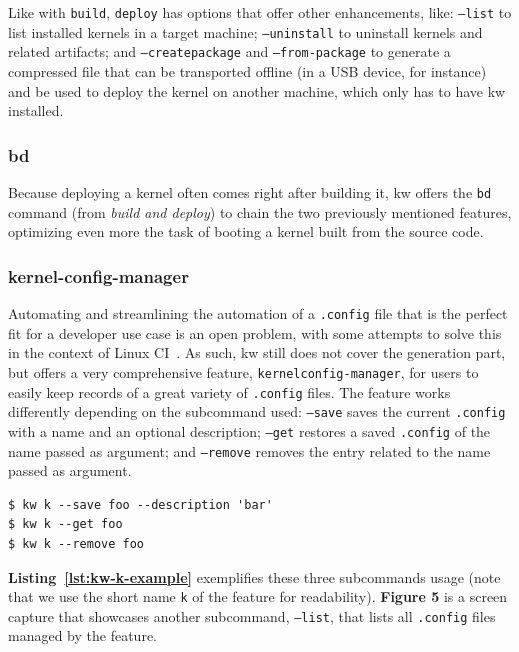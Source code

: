 Like with \texttt{build}, \texttt{deploy} has options that offer other
enhancements, like: \texttt{--list} to list installed kernels in a target
machine; \texttt{--uninstall} to uninstall kernels and related artifacts; and
\texttt{--create\-package} and \texttt{--from-package} to generate a compressed
file that can be transported offline (in a USB device, for instance) and be used
to deploy the kernel on another machine, which only has to have kw installed.

\subsubsection{bd}

Because deploying a kernel often comes right after building it, kw offers the
\texttt{bd} command (from \textit{build and deploy}) to chain the two previously
mentioned features, optimizing even more the task of booting a kernel built from
the source code.

\subsubsection{kernel-config-manager}

Automating and streamlining the automation of a \texttt{.config} file that is
the perfect fit for a developer use case is an open problem, with some attempts
to solve this in the context of Linux CI~\cite{yildiran2024maximizing}. As such,
kw still does not cover the generation part, but offers a very comprehensive
feature, \texttt{kernel\-config-manager}, for users to easily keep records of a
great variety of \texttt{.config} files. The feature works differently depending
on the subcommand used: \texttt{--save} saves the current \texttt{.config} with
a name and an optional description; \texttt{--get} restores a saved
\texttt{.config} of the name passed as argument; and \texttt{--remove} removes
the entry related to the name passed as argument.

\begin{lstlisting}[caption={\texttt{kw kernel-config-manager} use case.}, label={lst:kw-k-example}]
$ kw k --save foo --description 'bar'
$ kw k --get foo
$ kw k --remove foo
\end{lstlisting}

\textbf{Listing~\ref{lst:kw-k-example}} exemplifies these three subcommands
usage (note that we use the short name \texttt{k} of the feature for
readability). \textbf{Figure 5} is a screen capture that showcases another
subcommand, \texttt{--list}, that lists all \texttt{.config} files managed by
the feature.

